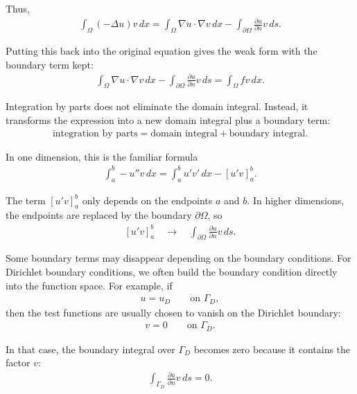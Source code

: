 \documentclass[../main.tex]{subfiles}
\begin{document}
\noindent Thus,
\begin{align*}
    \int_\Omega (-\Delta u)v \, dx
    =
    \int_\Omega \nabla u \cdot \nabla v \, dx
    -
    \int_{\partial \Omega} \frac{\partial u}{\partial n}v \, ds.
\end{align*}

\noindent Putting this back into the original equation gives the weak form with the boundary term kept:
\begin{align*}
    \int_\Omega \nabla u \cdot \nabla v \, dx
    -
    \int_{\partial \Omega} \frac{\partial u}{\partial n}v \, ds
    =
    \int_\Omega fv \, dx.
\end{align*}

Integration by parts does not eliminate the domain integral. Instead, it transforms the expression into a new domain integral plus a boundary term:
\begin{align*}
    \text{integration by parts}
    =
    \text{domain integral}
    +
    \text{boundary integral}.
\end{align*}

\noindent In one dimension, this is the familiar formula
\begin{align*}
    \int_a^b -u''v \, dx
    =
    \int_a^b u'v' \, dx
    -
    \left[u'v\right]_a^b.
\end{align*}

\noindent The term $\left[u'v\right]_a^b$ only depends on the endpoints $a$ and $b$. In higher dimensions, the endpoints are replaced by the boundary $\partial \Omega$, so
\begin{align*}
    \left[u'v\right]_a^b
    \quad \longrightarrow \quad
    \int_{\partial \Omega} \frac{\partial u}{\partial n}v \, ds.
\end{align*}

\noindent Some boundary terms may disappear depending on the boundary conditions. For Dirichlet boundary conditions, we often build the boundary condition directly into the function space. For example, if
\begin{align*}
    u = u_D \qquad \text{on } \Gamma_D,
\end{align*}
\noindent then the test functions are usually chosen to vanish on the Dirichlet boundary:
\begin{align*}
    v = 0 \qquad \text{on } \Gamma_D.
\end{align*}

\noindent In that case, the boundary integral over $\Gamma_D$ becomes zero because it contains the factor $v$:
\begin{align*}
    \int_{\Gamma_D} \frac{\partial u}{\partial n}v \, ds = 0.
\end{align*}
\end{document}
